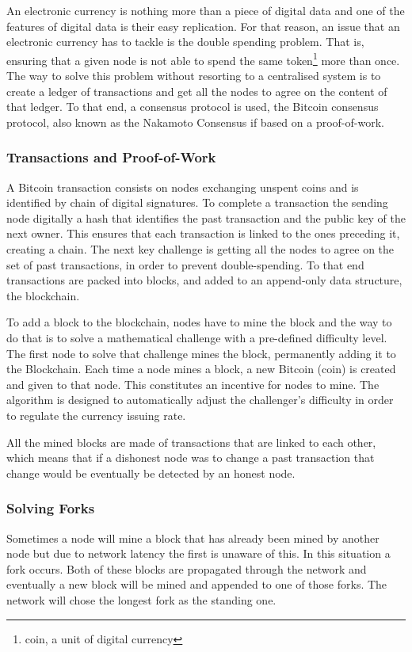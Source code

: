 \documentclass[llncsdoc]{llncs}
\begin{document}
 An electronic currency is nothing more than a piece of digital data and one of the features of digital data is their easy replication. For that reason, an issue that an electronic currency has to tackle is the double spending problem. That is, ensuring that a given node is not able to spend the same token\footnote{coin, a unit of digital currency} more than once. The way to solve this problem without resorting to a centralised system is to create a ledger of transactions and get all the nodes to agree on the content of that ledger. 
 To that end, a consensus protocol is used, the Bitcoin consensus protocol, also known as the Nakamoto Consensus if based on a proof-of-work.
 
 \subsubsection{Transactions and Proof-of-Work}
 A Bitcoin transaction consists on nodes exchanging unspent coins and is identified by chain of digital signatures. To complete a transaction the sending node digitally a hash that identifies the past transaction and the public key of the next owner. This ensures that each transaction is linked to the ones preceding it, creating a chain.
 The next key challenge is getting all the nodes to agree on the set of past transactions, in order to prevent double-spending.
 To that end transactions are packed into blocks, and added to an append-only data structure, the blockchain.
 
 To add a block to the blockchain, nodes have to mine the block and the way to do that is to solve a mathematical challenge with a pre-defined difficulty level. The first node to solve that challenge mines the block, permanently adding it to the Blockchain. Each time a node mines a block, a new Bitcoin (coin) is created and given to that node. This constitutes an incentive for nodes to mine. The algorithm is designed to automatically adjust the challenger's difficulty in order to regulate the currency issuing rate.
 
 All the mined blocks are made of transactions that are linked to each other, which means that if a dishonest node was to change a past transaction that change would be eventually be detected by an honest node.
 
 
\subsubsection{Solving Forks}
Sometimes a node will mine a block that has already been mined by another node but due to network latency the first is unaware of this. In this situation a fork occurs. Both of these blocks are propagated through the network and eventually a new block will be mined and appended to one of those forks. The network will chose the longest fork as the standing one.
\end{document}
